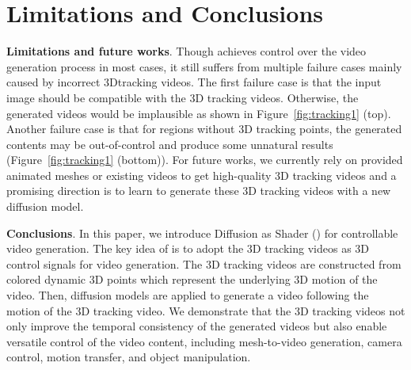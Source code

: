 

\section{Limitations and Conclusions}

\textbf{Limitations and future works}. 
Though \methodname achieves control over the video generation process in most cases, it still suffers from multiple failure cases mainly caused by incorrect 3Dtracking videos.
The first failure case is that the input image should be compatible with the 3D tracking videos. Otherwise, the generated videos would be implausible as shown in Figure~\ref{fig:tracking1} (top). Another failure case is that for regions without 3D tracking points, the generated contents may be out-of-control and produce some unnatural results (Figure~\ref{fig:tracking1} (bottom)).
For future works, we currently rely on provided animated meshes or existing videos to get high-quality 3D tracking videos and a promising direction is to learn to generate these 3D tracking videos with a new diffusion model.

\noindent\textbf{Conclusions}. In this paper, we introduce Diffusion as Shader (\methodname) for controllable video generation. 
The key idea of \methodname is to adopt the 3D tracking videos as 3D control signals for video generation. The 3D tracking videos are constructed from colored dynamic 3D points which represent the underlying 3D motion of the video. Then, diffusion models are applied to generate a video following the motion of the 3D tracking video. We demonstrate that the 3D tracking videos not only improve the temporal consistency of the generated videos but also enable versatile control of the video content, including mesh-to-video generation, camera control, motion transfer, and object manipulation.
